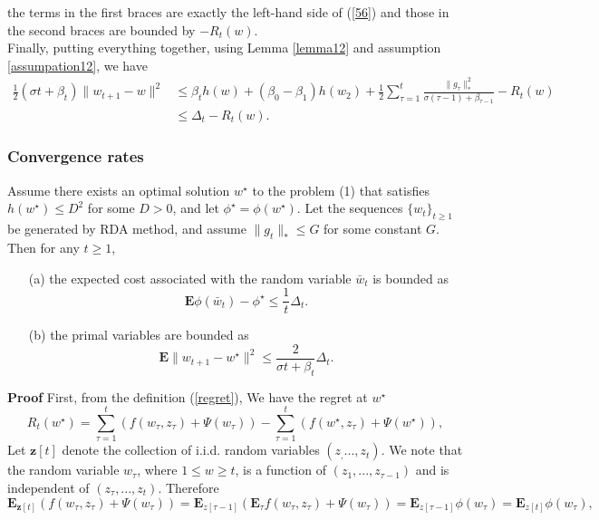 the terms in the first braces are exactly the left-hand side of (\ref{56}) and those in the second braces are bounded by $-R_t(w)$.\\
Finally, putting everything together, using Lemma \ref{lemma12} and assumption \ref{assumpation12}, we have
\begin{equation}
	\begin{split}
		\frac{1}{2}(\sigma t+\beta_t)\|w_{t+1}-w\|^2 &\leq \beta_t h(w)+
		(\beta_0-\beta_1)h(w_2)+\frac{1}{2}\sum\limits_{\tau =1}^{t}\frac{\|g_{\tau}\|^2_{\ast}}{\sigma(\tau -1)+\beta_{\tau -1}}-
		R_t(w)\\
		&\leq \Delta_t-R_t(w).
	\end{split}
\end{equation}

\subsubsection{Convergence rates}
\begin{theorem}\label{2}
	Assume there exists an optimal solution $w^{\star}$ to the problem (1) that satisfies $h(w^{\star})\leq D^2$ for some $D>0$, and let $\phi^{\star}=\phi(w^{\star}).$ Let the sequences $\{w_t\}_{t\geq 1}$ be generated by RDA method, and assume $\|g_t\|_{\ast}\leq G$ for some constant $G$. Then for any $t\geq 1$,
	\begin{itemize}
		\item[(a)] the expected cost associated with the random variable $\bar{w}_t$ is bounded as
		$$
		\mathbf{E}\phi(\bar{w}_t)-\phi^{\star}
		\leq \frac{1}{t}\Delta_t.
		$$
		\item[(b)] the primal variables are bounded as 
		$$
		\mathbf{E}\|w_{t+1}-w^{\star}\|^2\leq \frac{2}{\sigma t+\beta_t}\Delta_t.
		$$
	\end{itemize}
\end{theorem}
\textbf{Proof} First, from the definition (\ref{regret}), We have the regret at $w^{\star}$
$$
R_t(w^{\star})=\sum_{\tau=1}^{t}(f(w_{\tau},z_{\tau})+\Psi(w_{\tau})) - \sum_{\tau=1}^{t}(f(w^{\star},z_{\tau})+\Psi(w^{\star})),
$$
Let $\mathbf{z}[t]$ denote the collection of i.i.d. random variables $(z_,...,z_t)$. We note that the random variable $w_{\tau}$, where $1\leq w \geq t$, is a function of $(z_1,...,z_{\tau -1})$ and is independent of $(z_{\tau},...,z_t)$. Therefore
$$
\mathbf{E}_{\mathbf{z}[t]}\left( f(w_{\tau},z_{\tau})+\Psi(w_{\tau})\right)=
\mathbf{E}_{z[\tau-1]} \left( \mathbf{E}_{\tau} f(w_{\tau},z_{\tau})+\Psi(w_{\tau})\right)=
\mathbf{E}_{z[\tau-1]}\phi(w_{\tau})=
\mathbf{E}_{z[t]}\phi(w_{\tau}),
$$
